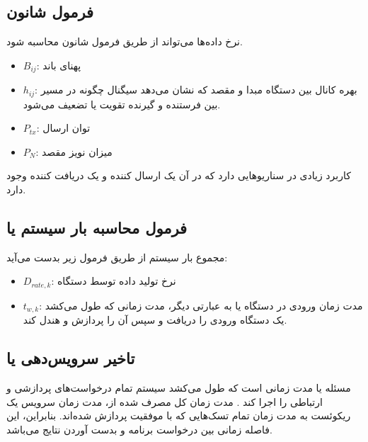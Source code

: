 \documentclass[a4paper]{article}
\begin{document}
\subsection{فرمول شانون}

نرخ داده‌ها می‌تواند از طریق فرمول شانون محاسبه شود.


\begin{itemize}
    \item $B_{ij}$: پهنای باند
    \item $h_{ij}$: بهره کانال بین دستگاه مبدا و مقصد که نشان می‌دهد سیگنال
    چگونه در مسیر بین فرستنده و گیرنده تقویت یا تضعیف می‌شود.
    \item $P_{tx}$: توان ارسال
    \item $P_{N}$: میزان نویز مقصد
\end{itemize}

کاربرد زیادی در سناریو‌هایی دارد که در آن یک ارسال کننده و یک دریافت کننده وجود
دارد.

\subsection{فرمول محاسبه بار سیستم یا }

مجموع بار سیستم از طریق فرمول زیر بدست می‌آید:


\begin{itemize}
    \item $D_{rate, k}$: نرخ تولید داده توسط دستگاه 
    \item $t_{w, k}$: مدت زمان ورودی در دستگاه  یا به عبارتی دیگر، مدت
    زمانی که طول می‌کشد یک دستگاه  ورودی را دریافت و سپس آن را پردازش و
    هندل کند.
\end{itemize}

\subsection{تاخیر سرویس‌دهی یا }

مسئله  یا  مدت زمانی
است که طول می‌کشد سیستم  تمام درخواست‌های پردازشی و ارتباطی را اجرا کند
. مدت زمان کل مصرف شده از، مدت زمان سرویس
یک ریکوئست به مدت زمان تمام تسک‌هایی که با موفقیت پردازش شده‌اند. بنابراین، این
فاصله زمانی بین درخواست برنامه و بدست آوردن نتایج می‌باشد.
\end{document}
